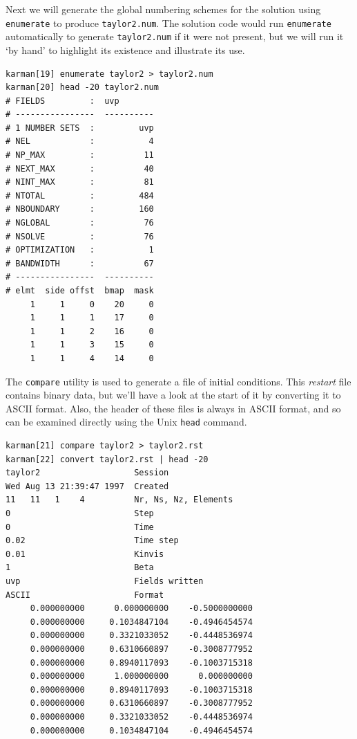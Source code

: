 \documentclass[11pt,a4paper]{report}
\begin{document}
Next we will generate the global numbering schemes for the solution
using \texttt{enumerate} to produce \texttt{taylor2.num}.  The
solution code would run \texttt{enumerate} automatically to generate
\texttt{taylor2.num} if it were not present, but we will run it `by
hand' to highlight its existence and illustrate its use.
{\small
\begin{verbatim}
karman[19] enumerate taylor2 > taylor2.num
karman[20] head -20 taylor2.num
# FIELDS         :  uvp
# ----------------  ----------
# 1 NUMBER SETS  :         uvp
# NEL            :           4
# NP_MAX         :          11
# NEXT_MAX       :          40
# NINT_MAX       :          81
# NTOTAL         :         484
# NBOUNDARY      :         160
# NGLOBAL        :          76
# NSOLVE         :          76
# OPTIMIZATION   :           1
# BANDWIDTH      :          67
# ----------------  ----------
# elmt  side offst  bmap  mask
     1     1     0    20     0
     1     1     1    17     0
     1     1     2    16     0
     1     1     3    15     0
     1     1     4    14     0
\end{verbatim}
}

The \texttt{compare} utility is used to generate a file of initial
conditions.  This \textsl{restart} file contains binary data, but
we'll have a look at the start of it by converting it to ASCII format.
Also, the header of these files is always in ASCII format, and so can
be examined directly using the Unix \texttt{head} command.
{\small
\begin{verbatim}
karman[21] compare taylor2 > taylor2.rst
karman[22] convert taylor2.rst | head -20
taylor2                   Session
Wed Aug 13 21:39:47 1997  Created
11   11   1    4          Nr, Ns, Nz, Elements
0                         Step
0                         Time
0.02                      Time step
0.01                      Kinvis
1                         Beta
uvp                       Fields written
ASCII                     Format
     0.000000000      0.000000000    -0.5000000000 
     0.000000000     0.1034847104    -0.4946454574 
     0.000000000     0.3321033052    -0.4448536974 
     0.000000000     0.6310660897    -0.3008777952 
     0.000000000     0.8940117093    -0.1003715318 
     0.000000000      1.000000000      0.000000000 
     0.000000000     0.8940117093    -0.1003715318 
     0.000000000     0.6310660897    -0.3008777952 
     0.000000000     0.3321033052    -0.4448536974 
     0.000000000     0.1034847104    -0.4946454574 
\end{verbatim}
}
\end{document}
